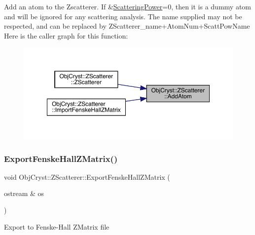 Add an atom to the Zscatterer. If \&\mbox{\hyperlink{class_obj_cryst_1_1_scattering_power}{Scattering\+Power}}=0, then it is a \textquotesingle{}dummy\textquotesingle{} atom and will be ignored for any scattering analysis. The \textquotesingle{}name\textquotesingle{} supplied may not be respected, and can be replaced by \textquotesingle{}Z\+Scatterer\+\_\+name\textquotesingle{}+\textquotesingle{}Atom\+Num\textquotesingle{}+\textquotesingle{}Scatt\+Pow\+Name\textquotesingle{} Here is the caller graph for this function\+:
\nopagebreak
\begin{figure}[H]
\begin{center}
\leavevmode
\includegraphics[width=350pt]{class_obj_cryst_1_1_z_scatterer_abe2114dff3bb1a170b4a0a855ba8bafa_icgraph}
\end{center}
\end{figure}
\mbox{\label{class_obj_cryst_1_1_z_scatterer_a551fabc1d57cab02e957946dcfa1aae7}} 
\subsubsection{\texorpdfstring{ExportFenskeHallZMatrix()}{ExportFenskeHallZMatrix()}}
{\footnotesize\ttfamily void Obj\+Cryst\+::\+Z\+Scatterer\+::\+Export\+Fenske\+Hall\+Z\+Matrix (\begin{DoxyParamCaption}\item[{ostream \&}]{os }\end{DoxyParamCaption})}

Export to Fenske-\/\+Hall Z\+Matrix file


